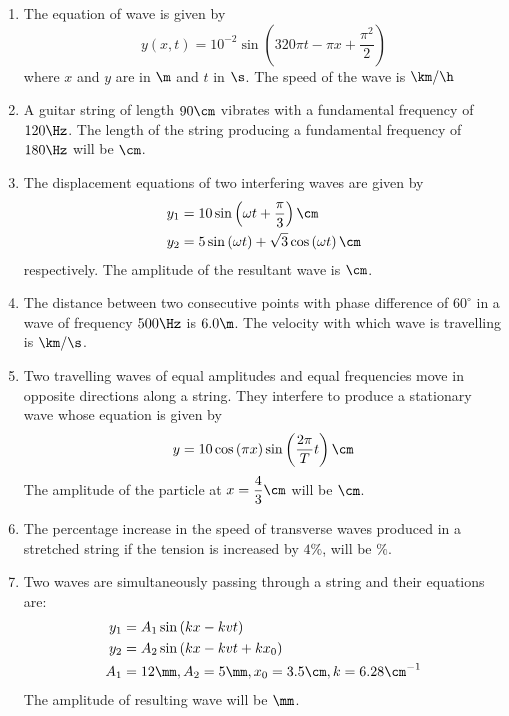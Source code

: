 \documentclass{article}
\def\ansint#1{\quad}
\begin{document}
\jeeSectionB
\begin{enumerate}\addtocounter{enumi}{20}
\item The equation of wave is given by \[ y(x, t) = 10^{-2}\sin\left(320\pi t -\pi x + \dfrac{\pi^2}{2}\right) \] where $x$ and $y$ are in $\m$ and $t$ in $\s$. The speed of the wave is \hrulefill $\km/\h$\ansint{1152}

\item A guitar string of length $90 \cm$ vibrates with a fundamental frequency of $120 \Hz$. The length of the string producing a fundamental frequency of $180 \Hz$ will be \hrulefill $\cm$. \ansint{60}

\item The displacement equations of two interfering waves are given by
	\begin{align*}
		y_1 &= 10\sin\left(\omega t + \dfrac{\pi}{3}\right) \cm\\
		y_2 &= 5\sin\left(\omega t\right) + \sqrt{3}\cos\left(\omega t\right) \cm
	\end{align*}
	respectively. The amplitude of the resultant wave is \hrulefill $\cm$. \ansint{20}

\item The distance between two consecutive points with phase difference of $60^\circ$ in a wave of frequency $500 \Hz$ is $6.0 \m$. The velocity with which wave is travelling is \hrulefill $\km/\s$. \ansint{18}

\item Two travelling waves of equal amplitudes and equal frequencies move in opposite directions along a string. They interfere to produce a stationary wave whose equation is given by \[ y=10\cos\left(\pi x\right)\sin\left(\dfrac{2\pi}{T}t\right) \cm\] The amplitude of the particle at $x=\dfrac{4}{3} \cm$ will be \hrulefill $\cm$. \ansint{5}

\item The percentage increase in the speed of transverse waves produced in a stretched string if the tension is \linebreak increased by $4\%$, will be \hrulefill $\%$. \ansint{2} 

\item Two waves are simultaneously passing through a string and their equations are:
	\begin{align*}
		y_1 &= A_1\sin\left(kx -kvt\right) \\
		y_2 &= A_2\sin\left(kx -kvt + kx_0\right)\\
		A_1 &= 12\mm, A_2=5\mm, x_0=3.5\cm, k=6.28\cm^{-1}
	\end{align*}
	The amplitude of resulting wave will be \hrulefill $\mm$. \ansint{7}


\end{enumerate}
\end{document}
